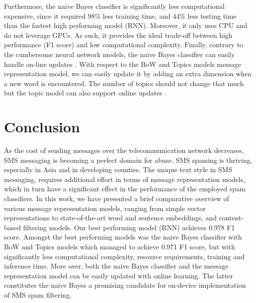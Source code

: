 \documentclass[letterpaper]{article}
\begin{document}
Furthermore, the naive Bayes classifier is significantly less computational expensive, since it required $98\%$ less training time, and $44\%$ less testing time than the fastest high performing model (RNN). Moreover, it only uses CPU and do not leverage GPUs. As such, it provides the ideal trade-off between high performance (F1 score) and low computational complexity. Finally, contrary to the cumbersome neural network models, the naive Bayes classifier can easily handle on-line updates \cite{chan1982updating}. With respect to the BoW and Topics models message representation model, we can easily update it by adding an extra dimension when a new word is encountered. The number of topics should not change that much but the topic model can also support online updates \cite{canini2009online}.

\section{Conclusion} \label{Conclusion}

As the cost of sending messages over the telecommunication network decreases, SMS messaging is becoming a perfect domain for abuse. SMS spaming is thriving, especially in Asia and in developing counties. The unique text style in SMS messaging, requires additional effort in terms of message representation models, which in turn have a significant effect in the performance of the employed spam classifiers. In this work, we have presented a brief comparative overview of various message representation models, ranging from simple vector representations to state-of-the-art word and sentence embeddings, and content-based filtering models. Our best performing model (RNN) achieves 0.978 F1 score. Amongst the best performing models was the naive Bayes classifier with BoW and Topics models which managed to achieve 0.971 F1 score, but with significantly less computational complexity, resource requirements, training and inference time. More over, both the naive Bayes classifier and the message representation model can be easily updated with online learning. The latter constitutes the naive Bayes a promising candidate for on-device implementation of SMS spam filtering.
\end{document}
